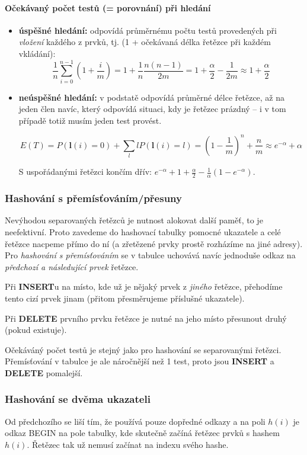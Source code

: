 \documentclass[11pt]{report} %
\numberwithin{equation}{section}
\begin{document}
\paragraph{Očekávaný počet testů (= porovnání) při hledání}
\begin{itemize}
\item \textbf{úspěšné hledání:} odpovídá průměrnému počtu testů provedených při \textit{vložení} každého z prvků, tj. (1 + očekávaná délka řetězce při každém vkládání):
$$\frac{1}{n}\sum_{i=0}^{n-1}\left(1+\frac{i}{m}\right) = 1 + \frac{1}{n}\frac{n(n-1)}{2m} = 1 + \frac{\alpha}{2} - \frac{1}{2m} \approx 1 + \frac{\alpha}{2}$$

\item \textbf{neúspěšné hledání:} v podstatě odpovídá průměrné délce řetězce, až na jeden člen navíc, který odpovídá situaci, kdy je řetězec prázdný -- i v tom případě totiž musím jeden test provést.

$$E(T) = P(\mathbf{l}(i) = 0) + \sum_l l P(\mathbf{l}(i) = l) = \left(1-\frac{1}{m}\right)^n + \frac{n}{m} \approx e^{-\alpha} + \alpha$$

S uspořádanými řetězci končím dřív: $e^{-\alpha}+1+\frac{\alpha}{2}-\frac{1}{\alpha}(1-e^{-\alpha})$.
\end{itemize}


\subsubsection{Hashování s přemísťováním/přesuny}
Nevýhodou separovaných řetězců je nutnost alokovat další paměť, to je neefektivní. Proto zavedeme do hashovací tabulky pomocné ukazatele a celé řetězce nacpeme přímo do ní (a zřetězené prvky prostě rozházíme na jiné adresy). Pro \emph{hashování s přemísťováním} se v tabulce uchovává navíc jednoduše odkaz na \emph{předchozí a následující prvek} řetězce. 

Při \textbf{INSERT}u na místo, kde už je nějaký prvek z \textit{jiného} řetězce, přehodíme tento cizí prvek jinam (přitom přesměrujeme příslušné ukazatele).

Při \textbf{DELETE} prvního prvku řetězce je nutné na jeho místo přesunout druhý (pokud existuje).

Očekáváný počet testů je stejný jako pro hashování se separovanými řetězci. Přemísťování v tabulce je ale náročnější než 1 test, proto jsou \textbf{INSERT} a \textbf{DELETE} pomalejší.

\subsubsection{Hashování se dvěma ukazateli}
Od předchozího se liší tím, že používá pouze dopředné odkazy a na poli $h(i)$ je odkaz BEGIN na pole tabulky, kde skutečně začíná řetězec prvků s hashem $h(i)$. Řetězec tak už nemusí začínat na indexu svého hashe.
\end{document}
